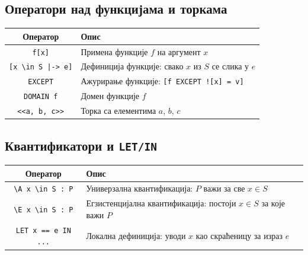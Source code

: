 \subsection{Оператори над функцијама и торкама}
\begin{center}
\begin{tabularx}{\textwidth}{|c|X|}
\hline
\textbf{Оператор} & \textbf{Опис} \\
\hline
\texttt{f[x]}                        & Примена функције $f$ на аргумент $x$ \\
\texttt{[x \textbackslash in S |-> e]} & Дефиниција функције: свако $x$ из $S$ се слика у $e$ \\
\texttt{EXCEPT}                      & Ажурирање функције: \texttt{[f EXCEPT ![x] = v]} \\
\texttt{DOMAIN f}                    & Домен функције $f$ \\
\texttt{<<a, b, c>>}                 & Торка са елементима $a$, $b$, $c$ \\
\hline
\end{tabularx}
\end{center}

\subsection{Квантификатори и \texttt{LET/IN}}
\begin{center}
\begin{tabularx}{\textwidth}{|c|X|}
\hline
\textbf{Оператор} & \textbf{Опис} \\
\hline
\texttt{\textbackslash A x \textbackslash in S : P} & Универзална квантификација: $P$ важи за све $x \in S$ \\
\texttt{\textbackslash E x \textbackslash in S : P} & Егзистенцијална квантификација: постоји $x \in S$ за које важи $P$ \\
\texttt{LET x == e IN ...}           & Локална дефиниција: уводи $x$ као скраћеницу за израз $e$ \\
\hline
\end{tabularx}
\end{center}

